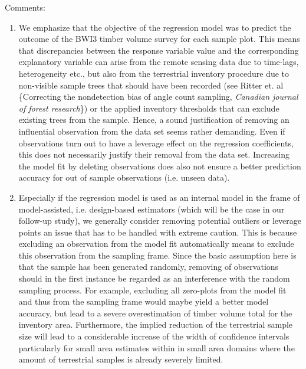 \documentclass{article}
\begin{document}
\begin{enumerate}
{    Comments:
    
	  \begin{enumerate}
	  	
		\item We emphasize that the objective of the regression model was to predict the outcome of the BWI3 timber volume survey for each sample plot. This means that discrepancies between the response variable value and the corresponding explanatory variable can arise from the remote sensing data due to time-lags, heterogeneity etc., but also from the terrestrial inventory procedure due to non-visible sample trees that should have been recorded (see Ritter et. al \{Correcting the nondetection bias of angle count sampling, \textit{Canadian journal of forest research}\}) or the applied inventory thresholds that can exclude existing trees from the sample. Hence, a sound justification of removing an influential observation from the data set seems rather demanding. Even if observations turn out to have a leverage effect on the regression coefficients, this does not necessarily justify their removal from the data set. Increasing the model fit by deleting observations does also not ensure a better prediction accuracy for out of sample observations (i.e. unseen data).
		
		\item Especially if the regression model is used as an internal model in the frame of model-assisted, i.e. design-based estimators (which will be the case in our follow-up study), we generally consider removing potential outliers or leverage points an issue that has to be handled with extreme caution. This is because excluding an observation from the model fit automatically means to exclude this observation from the sampling frame. Since the basic assumption here is that the sample has been generated randomly, removing of observations should in the first instance be regarded as an interference with the random sampling process. For example, excluding all zero-plots from the model fit and thus from the sampling frame would maybe yield a better model accuracy, but lead to a severe overestimation of timber volume total for the inventory area. Furthermore, the implied reduction of the terrestrial sample size will lead to a considerable increase of the width of confidence intervals particularly for small area estimates within in small area domains where the amount of terrestrial samples is already severely limited.
		
	  \end{enumerate}

}
\end{enumerate}
\end{document}

